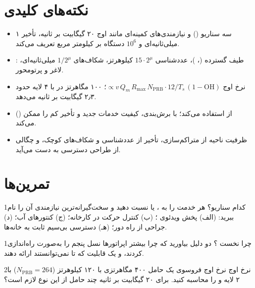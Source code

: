 \documentclass[11pt,a4paper]{article}
\begin{document}
\section{نکته‌های کلیدی}
\begin{takeawaybox}
\begin{itemize}
  \item {} سه سناریو () و نیازمندی‌های کمینه‌ای مانند اوج ۲۰ گیگابیت بر ثانیه، تأخیر ۱
        میلی‌ثانیه‌ای  و $10^6$ دستگاه بر کیلومتر مربع تعریف می‌کند.
  \item {}: طیف گسترده (، )، عددشناسی $15\cdot2^\mu$ کیلوهرتز، شکاف‌های $1/2^\mu$ میلی‌ثانیه‌ای، لاغر و
        پرتومحور.
  \item نرخ اوج $\propto v\,Q_m\,R_{\max}\,N_{\mathrm{PRB}}\cdot12/T_s\,(1-\mathrm{OH})$؛ ۱۰۰ مگاهرتز در  با ۴ لایه حدود ۲٫۳
        گیگابیت بر ثانیه می‌دهد.
  \item {} () از  استفاده می‌کند؛  با  برش‌بندی، کیفیت خدمات جدید و تأخیر کم را
        ممکن می‌کند.
  \item ظرفیت ناحیه از متراکم‌سازی، تأخیر از عددشناسی و شکاف‌های کوچک، و چگالی از طراحی دسترسی به دست می‌آید.
\end{itemize}
\end{takeawaybox}

\section{تمرین‌ها}

\begin{exercisebox}{1}{کدام سناریو؟}\label{exr:scenario}
هر خدمت را به ،  یا  نسبت دهید و سخت‌گیرانه‌ترین نیازمندی آن را نام ببرید: (الف) پخش
ویدئوی ؛ (ب) کنترل حرکت در کارخانه؛ (ج) کنتورهای آب؛ (د) جراحی از راه دور؛ (هـ) دسترسی بی‌سیم ثابت به خانه‌ها.
\end{exercisebox}

\begin{exercisebox}{1}{چرا نخست ؟}\label{exr:nsa}
دو دلیل بیاورید که چرا بیشتر اپراتورها نسل پنجم را به‌صورت  راه‌اندازی کردند، و یک قابلیت که تا 
نمی‌توانستند ارائه دهند.
\end{exercisebox}

\begin{exercisebox}{2}{نرخ اوج }\label{exr:fr2}
نرخ اوج فروسوی یک حامل ۴۰۰ مگاهرتزی  با ۱۲۰ کیلوهرتز ($N_{\mathrm{PRB}} = 264$) با ۲ لایه و  را محاسبه
کنید. برای ۲۰ گیگابیت بر ثانیه چند حامل از این نوع لازم است؟
\end{exercisebox}
\end{document}
